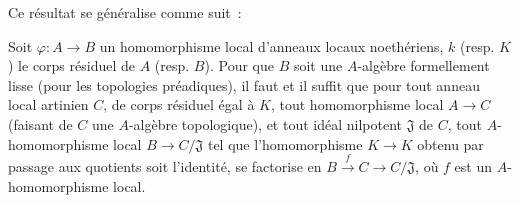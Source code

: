 
Ce résultat se généralise comme suit~:

\begin{proposition}[22.1.4]
\label{0.22.1.4-fr}
Soit $\varphi:A\to B$ un homomorphisme local d'anneaux locaux noethériens,
$k$ \textup{(resp. $K$)} le corps résiduel de $A$ \textup{(resp. $B$)}. Pour que $B$ soit une
$A$-algèbre formellement lisse (pour les topologies préadiques), il faut et
il suffit que pour tout anneau local \textup{artinien} $C$, de corps résiduel \textup{égal à}
$K$, tout homomorphisme local $A\to C$ (faisant de $C$ une $A$-algèbre
topologique), et tout idéal nilpotent $\mathfrak J$ de $C$, tout
$A$-homomorphisme local $B\to C/\mathfrak J$ tel que l'homomorphisme
$K\to K$ obtenu par passage aux quotients soit l'identité, se factorise en
$B\xrightarrow{f}C\to C/\mathfrak J$,
où $f$ est un $A$-homomorphisme local.
\end{proposition}

